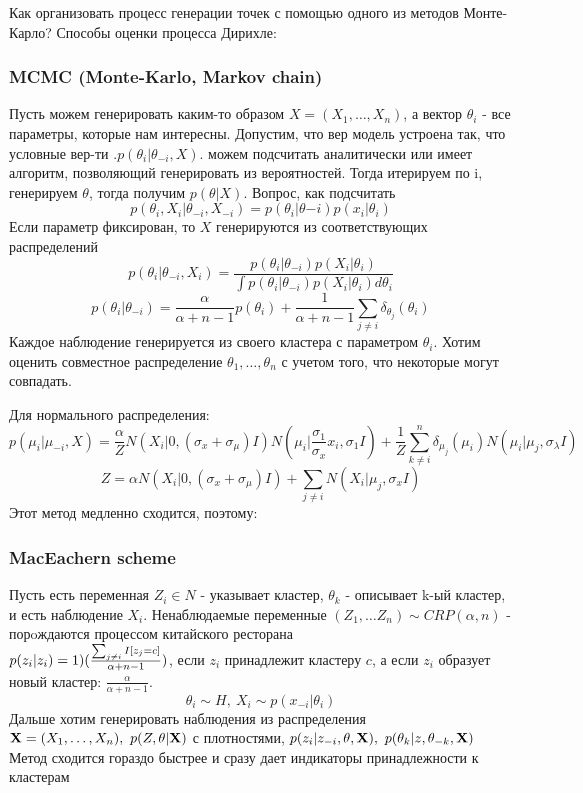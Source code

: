 Как организовать процесс генерации точек с помощью одного из методов Монте-Карло?
Способы оценки процесса Дирихле:

\subsubsection{MCMC (Monte-Karlo, Markov chain)}
Пусть можем генерировать каким-то образом $X = (X_1, \ldots, X_n)$, а вектор $\theta_i$ - все параметры, которые нам интересны. Допустим, что вер модель устроена так, что условные вер-ти .$p(\theta_i|\theta_{-i}, X)$. можем подсчитать аналитически или имеет алгоритм, позволяющий генерировать из вероятностей. Тогда итерируем по i, генерируем $\theta$, тогда получим $p(\theta|X)$. Вопрос, как подсчитать
$$ p(\theta_i, X_i | \theta_{-i}, X_{-i}) = p(\theta_i|\theta{-i})p(x_i | \theta_i) $$
Если параметр фиксирован, то $X$ генерируются из соответствующих распределений 
$$ p(\theta_i | \theta_{-i}, X_i) = \frac{p(\theta_i|\theta_{-i}) p(X_i|\theta_i) }{\int p(\theta_i|\theta_{-i}) p(X_i|\theta_i) d\theta_i} $$
$$ p(\theta_i | \theta_{-i}) = \frac{\alpha}{\alpha+n-1} p(\theta_i) + \frac{1}{\alpha+n-1} \sum_{j \neq i} \delta_{\theta_j}(\theta_i) $$
Каждое наблюдение генерируется из своего кластера с параметром $\theta_i$. Хотим оценить совместное распределение $\theta_1, \ldots, \theta_n$ с учетом того, что некоторые могут совпадать. 

Для нормального распределения:
$$ p(\mu_i|\mu_{-i}, X) = \frac{\alpha}{Z} N(X_i|0, (\sigma_x + \sigma_{\mu})I) N(\mu_i | \frac{\sigma_1}{\sigma_x}x_i, \sigma_1 I) + \frac{1}{Z} \sum_{k \neq i}^n \delta_{\mu_j}(\mu_i)N(\mu_i | \mu_j, \sigma_{\lambda}I) $$
$$ Z = \alpha N(X_i|0, (\sigma_x + \sigma_{\mu})I) + \sum_{j \neq i} N(X_i|\mu_j, \sigma_xI) $$
Этот метод медленно сходится, поэтому:

\subsubsection{MacEachern scheme}
Пусть есть переменная $Z_i \in N$ - указывает кластер, $\theta_k$ - описывает k-ый кластер, и есть наблюдение $X_i$. Ненаблюдаемые переменные $(Z_1, \ldots Z_n) \sim CRP(\alpha, n)$ - порoждаются процессом китайского ресторана \\
$p(z_i| z_{\-i}) = 1) (\frac{\sum_{j \neq i} I[z_j=c]}{\alpha+n-1})$, если $z_i$ принадлежит кластеру $c$, а если $z_i$ образует новый кластер: $ \frac{\alpha}{\alpha+n-1}$.
$$ \theta_i \sim H, \ X_i \sim p(x_{-i} | \theta_i) $$
Дальше хотим генерировать наблюдения из распределения $\textbf{X} = (X_1, \ldots, X_n), \ p(Z, \theta| \textbf{X})$ с плотностями, $p(z_i|z_{-i}, \theta, \textbf{X}), \ p(\theta_k | z, \theta_{-k}, \textbf{X})$
Метод сходится гораздо быстрее и сразу дает индикаторы принадлежности к кластерам

